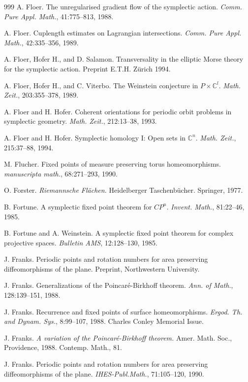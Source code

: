 \begin{thebibliography}{999}
 A. Floer. The unregularised gradient flow of the symplectic
action. \emph{Comm. Pure Appl. Math.}, 41:775--813, 1988.

 A. Floer. Cuplength estimates on Lagrangian intersections.
\emph{Comm. Pure Appl. Math.}, 42:335--356, 1989.

 A. Floer, Hofer H., and D. Salamon. Transversality in
the elliptic Morse theory for the symplectic action.
Preprint E.T.H. Zürich 1994.

 A. Floer, Hofer H., and C. Viterbo. The Weinstein conjecture
in $P \times \mathbb{C}^l$. \emph{Math. Zeit.}, 203:355--378, 1989.

 A. Floer and H. Hofer. Coherent orientations for periodic
orbit problems in symplectic geometry. \emph{Math. Zeit.}, 212:13--38,
1993.

 A. Floer and H. Hofer. Symplectic homology I: Open sets in
$\mathbb{C}^n$. \emph{Math. Zeit.}, 215:37--88, 1994.

 M. Flucher. Fixed points of measure preserving torus
homeomorphisms. \emph{manuscripta math.}, 68:271--293, 1990.

 O. Forster. \emph{Riemannsche Flächen.} Heidelberger
Taschenbücher. Springer, 1977.

 B. Fortune. A symplectic fixed point theorem for $CP^n$.
\emph{Invent. Math.}, 81:22--46, 1985.

 B. Fortune and A. Weinstein. A symplectic fixed point theorem
for complex projective spaces. \emph{Bulletin AMS}, 12:128--130, 1985.

 J. Franks. Periodic points and rotation numbers for area
preserving diffeomorphisms of the plane. Preprint, Northwestern University.

 J. Franks. Generalizations of the Poincaré-Birkhoff theorem.
\emph{Ann. of Math.}, 128:139--151, 1988.

 J. Franks. Recurrence and fixed points of surface
homeomorphisms. \emph{Ergod. Th. and Dynam. Sys.}, 8:99--107, 1988.
Charles Conley Memorial Issue.

 J. Franks. \emph{A variation of the Poincaré-Birkhoff
theorem.} Amer. Math. Soc., Providence, 1988. Contemp. Math., 81.

 J. Franks. Periodic points and rotation numbers for area
preserving diffeomorphisms of the plane. \emph{IHES-Publ.Math.},
71:105--120, 1990.


\end{thebibliography}
